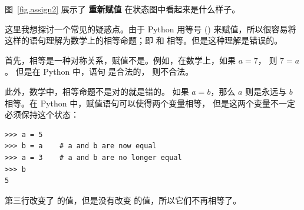 
图~\ref{fig.assign2} 展示了 {\bf 重新赋值} 在状态图中看起来是什么样子。
 


这里我想探讨一个常见的疑惑点。由于 Python 用等号 (\li{=}) 来赋值，所以很容易将  这样的语句理解为数学上的相等命题；即  和  相等。但是这种理解是错误的。


首先，相等是一种对称关系，赋值不是。例如，在数学上，如果 $a = 7$，
则 $7 = a$。 但是在 Python 中，语句  是合法的，  则不合法。


此外，数学中，相等命题不是对的就是错的。 如果 $a = b$，那么 $a$
则是永远与 $b$ 相等。在 Python 中，赋值语句可以使得两个变量相等，
但是这两个变量不一定必须保持这个状态：


\begin{lstlisting}
>>> a = 5
>>> b = a    # a and b are now equal
>>> a = 3    # a and b are no longer equal
>>> b
5
\end{lstlisting}

%

第三行改变了  的值，但是没有改变  的值，所以它们不再相等了。


